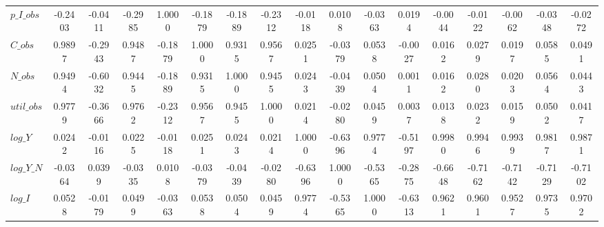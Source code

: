 \begin{center}
\begin{longtable}{lcccccccccccccccc}
$p\_I\_obs       $	 & 	           -0.2403	 & 	           -0.0411	 & 	           -0.2985	 & 	            1.0000	 & 	           -0.1879	 & 	           -0.1889	 & 	           -0.2312	 & 	           -0.0118	 & 	            0.0108	 & 	           -0.0363	 & 	            0.0194	 & 	           -0.0044	 & 	           -0.0122	 & 	           -0.0062	 & 	           -0.0348	 & 	           -0.0272 \\ 
$C\_obs          $	 & 	            0.9897	 & 	           -0.2943	 & 	            0.9487	 & 	           -0.1879	 & 	            1.0000	 & 	            0.9315	 & 	            0.9567	 & 	            0.0251	 & 	           -0.0379	 & 	            0.0538	 & 	           -0.0027	 & 	            0.0162	 & 	            0.0279	 & 	            0.0197	 & 	            0.0585	 & 	            0.0491 \\ 
$N\_obs          $	 & 	            0.9494	 & 	           -0.6032	 & 	            0.9445	 & 	           -0.1889	 & 	            0.9315	 & 	            1.0000	 & 	            0.9455	 & 	            0.0243	 & 	           -0.0439	 & 	            0.0504	 & 	            0.0011	 & 	            0.0162	 & 	            0.0280	 & 	            0.0203	 & 	            0.0564	 & 	            0.0443 \\ 
$util\_obs       $	 & 	            0.9779	 & 	           -0.3666	 & 	            0.9762	 & 	           -0.2312	 & 	            0.9567	 & 	            0.9455	 & 	            1.0000	 & 	            0.0214	 & 	           -0.0280	 & 	            0.0459	 & 	            0.0037	 & 	            0.0138	 & 	            0.0232	 & 	            0.0159	 & 	            0.0502	 & 	            0.0417 \\ 
$log\_Y          $	 & 	            0.0242	 & 	           -0.0116	 & 	            0.0225	 & 	           -0.0118	 & 	            0.0251	 & 	            0.0243	 & 	            0.0214	 & 	            1.0000	 & 	           -0.6396	 & 	            0.9774	 & 	           -0.5197	 & 	            0.9980	 & 	            0.9946	 & 	            0.9939	 & 	            0.9817	 & 	            0.9871 \\ 
$log\_Y\_N       $	 & 	           -0.0364	 & 	            0.0399	 & 	           -0.0335	 & 	            0.0108	 & 	           -0.0379	 & 	           -0.0439	 & 	           -0.0280	 & 	           -0.6396	 & 	            1.0000	 & 	           -0.5365	 & 	           -0.2875	 & 	           -0.6648	 & 	           -0.7162	 & 	           -0.7142	 & 	           -0.7129	 & 	           -0.7102 \\ 
$log\_I          $	 & 	            0.0528	 & 	           -0.0179	 & 	            0.0499	 & 	           -0.0363	 & 	            0.0538	 & 	            0.0504	 & 	            0.0459	 & 	            0.9774	 & 	           -0.5365	 & 	            1.0000	 & 	           -0.6313	 & 	            0.9621	 & 	            0.9601	 & 	            0.9527	 & 	            0.9735	 & 	            0.9702 \\ 

\end{longtable}
\end{center}
